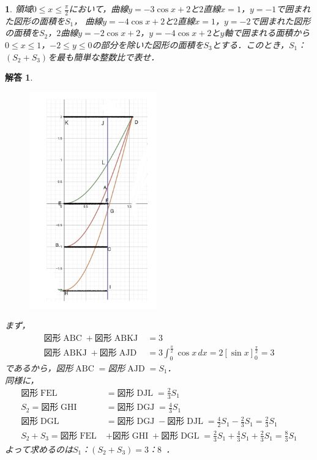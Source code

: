 \documentclass[dvipdfmx]{jsarticle}
\newtheorem*{answer*}{解答}
\newtheorem{prob}{}[]
\begin{document}
\begin{screen}
  \begin{prob}
    領域$0\leq x \leq \frac{\pi}{2}$において，曲線$y=-3\cos x+2$と$2$直線$x=1$，$y=-1$で囲まれた図形の面積を$S_{1}$，
    曲線$y=-4\cos x+2$と$2$直線$x=1$，$y=-2$で囲まれた図形の面積を$S_{2}$，$2$曲線$y=-2\cos x+2$，$y=-4\cos x+2$と$y$軸で囲まれる面積から
    $0\leq x \leq 1$，$-2\leq y\leq 0$の部分を除いた図形の面積を$S_{3}$とする．このとき，$S_{1}$：$\left(S_{2}+S_{3}\right)$を最も簡単な整数比で表せ．
  \end{prob}

\end{screen}
\begin{answer*}
  \begin{figure}[h]
    \centering
    \includegraphics[width=5.5cm]{AMC002-picture/mathtest2.png}
    \caption {}\label{ex2}
  \end{figure}
  まず，
  \begin{align*}
    図形\operatorname{ABC}+図形\operatorname{ABKJ}&=3\\
    図形\operatorname{ABKJ}+図形\operatorname{AJD}&=3\int_{0}^{\frac{\pi}{2}}  \cos x\,dx =2\left[\sin x\right]^{\frac{\pi}{2}}_{0}=3 
  \end{align*}
  であるから，図形$\operatorname{ABC}=$図形$\operatorname{AJD}=S_{1}$．\\
  同様に，
  \begin{align*}
    図形\operatorname{FEL}&=図形\operatorname{DJL}=\frac{2}{3}S_{1}\\
    S_{2}=図形\operatorname{GHI}&=図形\operatorname{DGJ}=\frac{4}{3}S_{1}\\
    図形\operatorname{DGL}&=図形\operatorname{DGJ}-図形\operatorname{DJL}=\frac{4}{2}S_{1}-\frac{2}{3}S_{1}=\frac{2}{3}S_{1}\\
    S_{2}+S_{3}=図形\operatorname{FEL}&+図形\operatorname{GHI}+図形\operatorname{DGL}=\frac{2}{3}S_{1}+\frac{4}{3}S_{1}+\frac{2}{3}S_{1}=\frac{8}{3}S_{1}
  \end{align*}
  よって求めるのは$S_{1}$：$\left(S_{2}+S_{3}\right)=3$：$8$\ ．\\
  \rightline{$\Box $}
\end{answer*} 
\end{document}
